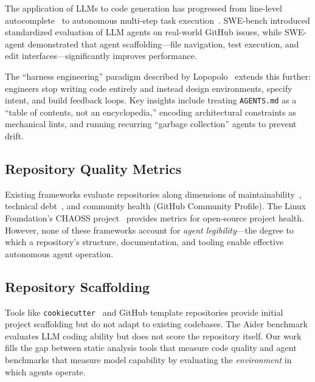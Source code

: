 \documentclass[11pt,twocolumn]{article}
\begin{document}
The application of LLMs to code generation has progressed from
line-level autocomplete~\citep{copilot2022} to autonomous multi-step
task execution~\citep{yang2024swe, jimenez2024swebench}. SWE-bench
\citep{jimenez2024swebench} introduced standardized evaluation of
LLM agents on real-world GitHub issues, while SWE-agent
\citep{yang2024swe} demonstrated that agent scaffolding---file
navigation, test execution, and edit interfaces---significantly
improves performance.

The ``harness engineering'' paradigm described by
Lopopolo~\citep{lopopolo2026harness} extends this further: engineers
stop writing code entirely and instead design environments, specify
intent, and build feedback loops. Key insights include treating
\texttt{AGENTS.md} as a ``table of contents, not an encyclopedia,''
encoding architectural constraints as mechanical lints, and running
recurring ``garbage collection'' agents to prevent drift.

\subsection{Repository Quality Metrics}

Existing frameworks evaluate repositories along dimensions of
maintainability~\citep{heitlager2007practical}, technical
debt~\citep{avgeriou2016managing}, and community health (GitHub
Community Profile). The Linux Foundation's CHAOSS
project~\citep{chaoss2023} provides metrics for open-source project
health. However, none of these frameworks account for
\emph{agent legibility}---the degree to which a repository's
structure, documentation, and tooling enable effective autonomous
agent operation.

\subsection{Repository Scaffolding}

Tools like \texttt{cookiecutter}~\citep{cookiecutter2013} and
GitHub template repositories provide initial project scaffolding but
do not adapt to existing codebases. The Aider benchmark
\citep{gauthier2024aider} evaluates LLM coding ability but does not
score the repository itself. Our work fills the gap between static
analysis tools that measure code quality and agent benchmarks that
measure model capability by evaluating the \emph{environment} in which
agents operate.

\end{document}
